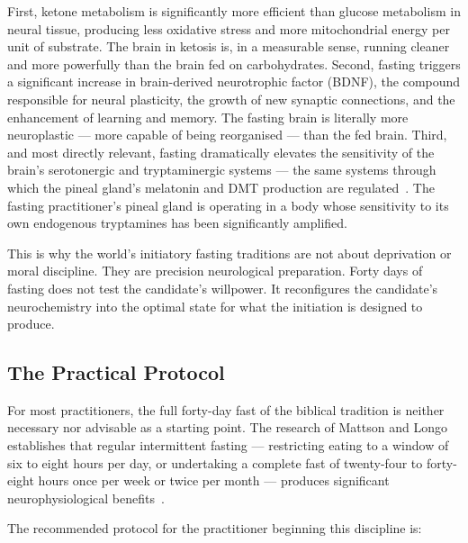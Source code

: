 \documentclass[12pt, a4paper]{article}
\begin{document}
First, ketone metabolism is significantly more efficient than glucose
metabolism in neural tissue, producing less oxidative stress and more
mitochondrial energy per unit of substrate. The brain in ketosis is, in a
measurable sense, running cleaner and more powerfully than the brain fed on
carbohydrates. Second, fasting triggers a significant increase in
brain-derived neurotrophic factor (BDNF), the compound responsible for neural
plasticity, the growth of new synaptic connections, and the enhancement of
learning and memory. The fasting brain is literally more neuroplastic —
more capable of being reorganised — than the fed brain. Third, and most
directly relevant, fasting dramatically elevates the sensitivity of the
brain's serotonergic and tryptaminergic systems — the same systems through
which the pineal gland's melatonin and DMT production are regulated~\autocite{mattson2014}.
The fasting practitioner's pineal gland is operating in a body whose
sensitivity to its own endogenous tryptamines has been significantly
amplified.

This is why the world's initiatory fasting traditions are not about deprivation
or moral discipline. They are precision neurological preparation. Forty days
of fasting does not test the candidate's willpower. It reconfigures the
candidate's neurochemistry into the optimal state for what the initiation is
designed to produce.

\subsection{The Practical Protocol}

For most practitioners, the full forty-day fast of the biblical tradition is
neither necessary nor advisable as a starting point. The research of Mattson
and Longo establishes that regular intermittent fasting — restricting eating
to a window of six to eight hours per day, or undertaking a complete fast of
twenty-four to forty-eight hours once per week or twice per month — produces
significant neurophysiological benefits~\autocite{mattson2014}.

The recommended protocol for the practitioner beginning this discipline is:
\end{document}
